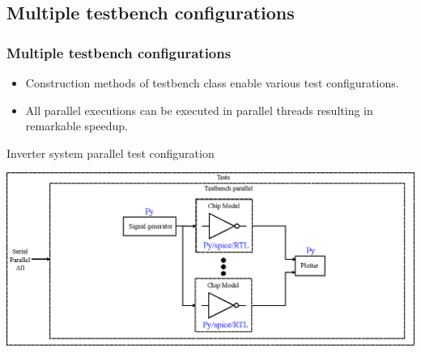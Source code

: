 \documentclass{sdkslides}
\begin{document}
\renewcommand{\sectionname}{Multiple testbench configurations}
\subsection*{\sectionname}
\begin{frame}[t]
    \frametitle{\sectionname}
    \begin{itemize}
        \item Construction methods of testbench class enable various test
            configurations.
        \item All parallel executions can be executed in parallel threads resulting in remarkable speedup. 
    \end{itemize}
    \begin{block}{Inverter system parallel test configuration}
        \begin{center}
            \includegraphics[width=\textwidth]{./Pics/Inverter_parallel.eps}
        \end{center}
    \end{block}
\end{frame}

\renewcommand{\sectionname}{Inverter system verification results}
\end{document}
